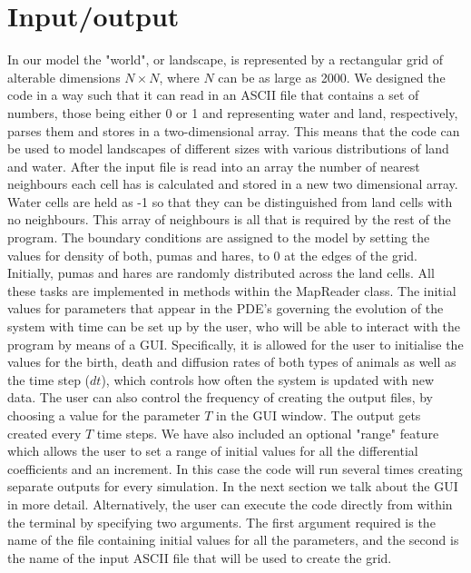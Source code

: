 \section{Input/output}
      
      In our model the "world", or landscape, is represented by a rectangular grid of alterable dimensions $N \times N$, where $N$ can be as large as 2000.
      We designed the code in a way such that it can read in an ASCII file that contains a set of numbers, those being either 0 or 1 and representing water and land, respectively, parses them and stores in a two-dimensional array. This means that the code can be used to model landscapes of different sizes with various distributions of land and water. After the input file is read into an array the number of nearest neighbours each cell has is calculated and stored in a new two dimensional array. Water cells are held as -1 so that they can be distinguished from land cells with no neighbours. This array of neighbours is all that is required by the rest of the program.
      \newline{}
      The boundary conditions are assigned to the model by setting the values for density of both, pumas and hares, to 0 at the edges of the grid.  Initially, pumas and hares are randomly distributed across the land cells. 
      All these tasks are implemented in methods within the MapReader class.
      \newline{}
      The initial values for parameters that appear in the PDE's governing the evolution of the system with time can be set up by the user, who will be able to interact with the program by means of a GUI. Specifically, it is allowed for the user to initialise the values for the birth, death and diffusion rates of both types of animals as well as the time step ($dt$), which controls how often the system is updated with new data.  The user can also control the frequency of creating the output files, by choosing a value for the parameter $T$ in the GUI window. The output gets created every $T$ time steps. We have also included an optional "range" feature which allows the user to set a range of initial values for all the differential coefficients and an increment. In this case the code will run several times creating separate outputs for every simulation. In the next section we talk about the GUI in more detail. 
      \newline{}
      Alternatively, the user can execute the code directly from within the terminal by specifying two arguments. The first argument required is the name of the file containing initial values for all the parameters, and the second is the name of the input ASCII file that will be used to create the grid. 
      \newline{}
      \newline{}
      
